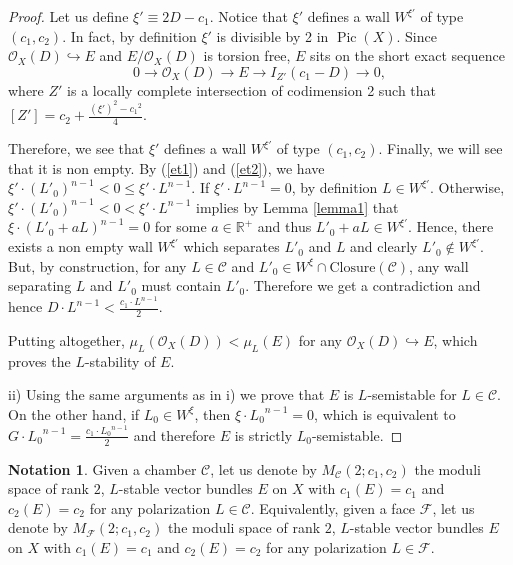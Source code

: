 \documentclass[11pt,twoside]{amsart}
\theoremstyle{definition}
\newtheorem{notation}[theorem]{Notation}
\newcommand {\Closure}{\mathrm{Closure}}
\newcommand{\Pic}{\operatorname{Pic}}
\newcommand{\Num}{\operatorname{Num}}
\begin{document}
\begin{proof}
Let us define $\xi'\equiv 2D-c_1$. Notice that $\xi'$ defines a wall $W^{\xi'}$ of type $(c_1,c_2)$.
In fact, by definition $\xi'$ is divisible by 2 in $\Pic(X)$.
Since $\mathcal{O}_X(D)\hookrightarrow E$ and $E/\mathcal{O}_X(D)$ is torsion free, $E$ sits on the short exact sequence $$0\rightarrow \mathcal{O}_X(D)\rightarrow E\rightarrow I_{Z'}(c_1-D)\rightarrow0,$$
where $Z'$ is a locally complete intersection of codimension 2 such that $[Z']=c_2+\frac{(\xi')^2-{c_1}^2}{4}$. 

Therefore, we see that $\xi'$ defines a  wall $W^{\xi'}$ of type $(c_1,c_2)$.
Finally, we will see that it is non empty.
By (\ref{et1}) and (\ref{et2}), we have  $\xi'\cdot (L'_0)^{n-1}<0\leq \xi'\cdot L^{n-1} $.
If $\xi'\cdot L^{n-1}=0$, by definition $L\in W^{\xi'}$. Otherwise,
$\xi'\cdot (L'_0)^{n-1}<0< \xi'\cdot L^{n-1} $ implies by Lemma \ref{lemma1} that $\xi\cdot(L'_0+aL)^{n-1}=0$ for some $a\in\mathbb{R}^+$ and thus $L'_0+aL\in W^{\xi'}$.
Hence, there exists a non empty wall $W^{\xi'}$ which separates $L'_0$ and $L$ and clearly $L'_0\not\in W^{\xi'}$. But, by construction, for any $L\in \mathcal{C}$ and $L'_0\in W^{\xi}\cap \Closure(\mathcal{C})$, any wall separating $L$ and $L'_0$ must contain $L'_0$. Therefore we get a contradiction and hence $D\cdot L^{n-1}<\frac{c_1\cdot L^{n-1}}{2}$.

Putting altogether, $\mu_L(\mathcal{O}_X(D))<\mu_L(E)$ for any $\mathcal{O}_X(D)\hookrightarrow E$, which proves the $L$-stability of $E$.

    ii) Using the same arguments as in i) we prove that $E$ is $L$-semistable for $L\in\mathcal{C}$. On the other hand, if $L_0\in W^{\xi}$, then $\xi\cdot {L_0}^{n-1}=0$, which is equivalent to $G\cdot {L_0}^{n-1}=\frac{c_1\cdot {L_0}^{n-1}}{2}$ and therefore $E$ is strictly $L_0$-semistable.
\end{proof}



\begin{notation}
    Given a chamber $\mathcal{C}$, let us denote by $M_{\mathcal{C}}(2;c_1,c_2)$ the moduli space of rank $2$, $L$-stable vector bundles $E$ on $X$ with $c_1(E)=c_1$ and $c_2(E)=c_2$ for any polarization $L\in \mathcal{C}$.
Equivalently, given a face $\mathcal{F}$, let us denote by $M_{\mathcal{F}}(2;c_1,c_2)$ the moduli space of rank $2$, $L$-stable vector bundles $E$ on $X$ with $c_1(E)=c_1$ and $c_2(E)=c_2$ for any polarization $L\in \mathcal{F}$.
\end{notation}
\end{document}
